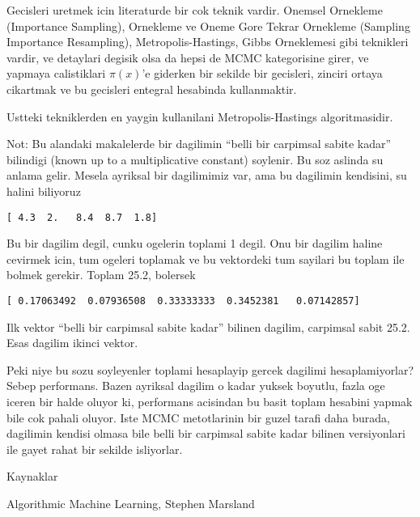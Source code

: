 \documentclass[12pt,fleqn]{article}
\begin{document}
Gecisleri uretmek icin literaturde bir cok teknik vardir.  Onemsel
Ornekleme (Importance Sampling), Ornekleme ve Oneme Gore Tekrar Ornekleme
(Sampling Importance Resampling), Metropolis-Hastings, Gibbs Orneklemesi
gibi teknikleri vardir, ve detaylari degisik olsa da hepsi de MCMC
kategorisine girer, ve yapmaya calistiklari $\pi(x)$'e giderken bir sekilde
bir gecisleri, zinciri ortaya cikartmak ve bu gecisleri entegral hesabinda
kullanmaktir.

Ustteki tekniklerden en yaygin kullanilani Metropolis-Hastings
algoritmasidir. 

Not: Bu alandaki makalelerde bir dagilimin ``belli bir carpimsal sabite
kadar'' bilindigi (known up to a multiplicative constant) soylenir. Bu soz
aslinda su anlama gelir. Mesela ayriksal bir dagilimimiz var, ama bu
dagilimin kendisini, su halini biliyoruz

\verb![ 4.3  2.   8.4  8.7  1.8]!

Bu bir dagilim degil, cunku ogelerin toplami 1 degil. Onu bir dagilim
haline cevirmek icin, tum ogeleri toplamak ve bu vektordeki tum sayilari bu
toplam ile bolmek gerekir. Toplam 25.2, bolersek

\verb![ 0.17063492  0.07936508  0.33333333  0.3452381   0.07142857]!

Ilk vektor ``belli bir carpimsal sabite kadar'' bilinen dagilim, carpimsal
sabit 25.2. Esas dagilim ikinci vektor. 

Peki niye bu sozu soyleyenler toplami hesaplayip gercek dagilimi
hesaplamiyorlar? Sebep performans. Bazen ayriksal dagilim o kadar yuksek
boyutlu, fazla oge iceren bir halde oluyor ki, performans acisindan bu
basit toplam hesabini yapmak bile cok pahali oluyor. Iste MCMC metotlarinin
bir guzel tarafi daha burada, dagilimin kendisi olmasa bile belli bir
carpimsal sabite kadar bilinen versiyonlari ile gayet rahat bir sekilde
isliyorlar.

Kaynaklar

Algorithmic Machine Learning, Stephen Marsland
\end{document}
